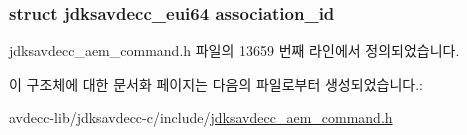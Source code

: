 \subsubsection[{\texorpdfstring{association\+\_\+id}{association_id}}]{\setlength{\rightskip}{0pt plus 5cm}struct {\bf jdksavdecc\+\_\+eui64} association\+\_\+id}\hypertarget{structjdksavdecc__aem__command__set__association__id_a0fa49c5118429af7a5ee7d71eada7b94}{}\label{structjdksavdecc__aem__command__set__association__id_a0fa49c5118429af7a5ee7d71eada7b94}


jdksavdecc\+\_\+aem\+\_\+command.\+h 파일의 13659 번째 라인에서 정의되었습니다.



이 구조체에 대한 문서화 페이지는 다음의 파일로부터 생성되었습니다.\+:\begin{DoxyCompactItemize}
\item 
avdecc-\/lib/jdksavdecc-\/c/include/\hyperlink{jdksavdecc__aem__command_8h}{jdksavdecc\+\_\+aem\+\_\+command.\+h}\end{DoxyCompactItemize}

